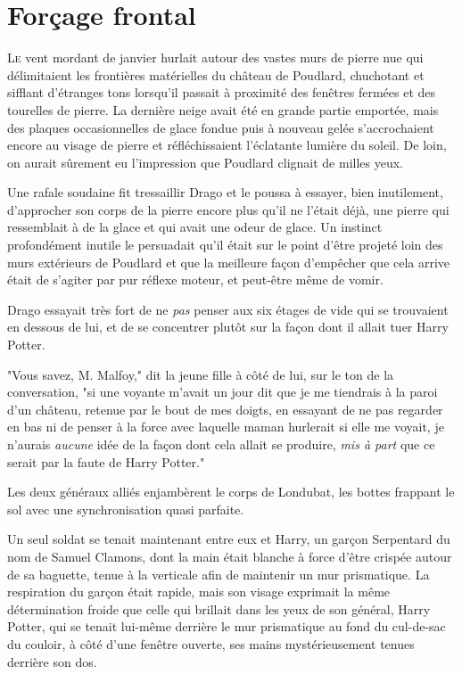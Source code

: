 \chapter{Forçage frontal}

\lettrine{L}{e} vent mordant de janvier hurlait autour des vastes murs de pierre nue qui délimitaient les frontières matérielles du château de Poudlard, chuchotant et sifflant d'étranges tons lorsqu'il passait à proximité des fenêtres fermées et des tourelles de pierre. La dernière neige avait été en grande partie emportée, mais des plaques occasionnelles de glace fondue puis à nouveau gelée s'accrochaient encore au visage de pierre et réfléchissaient l'éclatante lumière du soleil. De loin, on aurait sûrement eu l'impression que Poudlard clignait de milles yeux.

Une rafale soudaine fit tressaillir Drago et le poussa à essayer, bien inutilement, d'approcher son corps de la pierre encore plus qu'il ne l'était déjà, une pierre qui ressemblait à de la glace et qui avait une odeur de glace. Un instinct profondément inutile le persuadait qu'il était sur le point d'être projeté loin des murs extérieurs de Poudlard et que la meilleure façon d'empêcher que cela arrive était de s'agiter par pur réflexe moteur, et peut-être même de vomir.

Drago essayait très fort de ne \emph{pas} penser aux six étages de vide qui se trouvaient en dessous de lui, et de se concentrer plutôt sur la façon dont il allait tuer Harry Potter.

"Vous savez, M. Malfoy," dit la jeune fille à côté de lui, sur le ton de la conversation, "si une voyante m'avait un jour dit que je me tiendrais à la paroi d'un château, retenue par le bout de mes doigts, en essayant de ne pas regarder en bas ni de penser à la force avec laquelle maman hurlerait si elle me voyait, je n'aurais \emph{aucune} idée de la façon dont cela allait se produire, \emph{mis à part} que ce serait par la faute de Harry Potter."


Les deux généraux alliés enjambèrent le corps de Londubat, les bottes frappant le sol avec une synchronisation quasi parfaite.

Un seul soldat se tenait maintenant entre eux et Harry, un garçon Serpentard du nom de Samuel Clamons, dont la main était blanche à force d'être crispée autour de sa baguette, tenue à la verticale afin de maintenir un mur prismatique. La respiration du garçon était rapide, mais son visage exprimait la même détermination froide que celle qui brillait dans les yeux de son général, Harry Potter, qui se tenait lui-même derrière le mur prismatique au fond du cul-de-sac du couloir, à côté d'une fenêtre ouverte, ses mains mystérieusement tenues derrière son dos.

